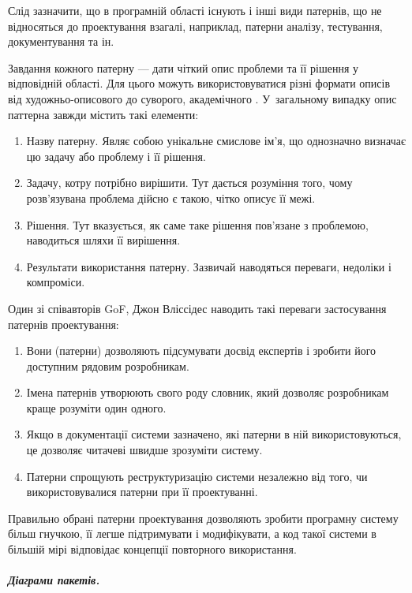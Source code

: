 \documentclass[../main.tex]{subfiles}
\begin{document}
		Слід зазначити, що в програмній області існують і інші види патернів, що не відносяться до проектування взагалі, наприклад, патерни аналізу, тестування, документування та ін.
		
		Завдання кожного патерну — дати чіткий опис проблеми та її рішення у відповідній області. Для цього можуть використовуватися різні формати описів від художньо-описового \cite{pattern_language} до суворого, академічного \cite{gof}. У~загальному випадку опис паттерна завжди містить такі елементи:
		
		\begin{enumerate}
			\item Назву патерну. Являє собою унікальне смислове ім'я, що однозначно визначає цю задачу або проблему і її рішення.
			\item Задачу, котру потрібно вирішити. Тут дається розуміння того, чому розв'язувана проблема дійсно є такою, чітко описує її межі.
			\item Рішення. Тут вказується, як саме таке рішення пов'язане з проблемою, наводиться шляхи її вирішення.
			\item Результати використання патерну. Зазвичай наводяться переваги, недоліки і компроміси.
		\end{enumerate}
		
		Один зі співавторів GoF, Джон Вліссідес \cite{patterns_application} наводить такі переваги застосування патернів проектування:
		
		\begin{enumerate}
			\item Вони (патерни) дозволяють підсумувати досвід експертів і зробити його доступним рядовим розробникам.
			\item Імена патернів утворюють свого роду словник, який дозволяє розробникам краще розуміти один одного.
			\item Якщо в документації системи зазначено, які патерни в ній використовуються, це дозволяє читачеві швидше зрозуміти систему.
			\item Патерни спрощують реструктуризацію системи незалежно від того, чи використовувалися патерни при її проектуванні.
		\end{enumerate}
		
		Правильно обрані патерни проектування дозволяють зробити програмну систему більш гнучкою, її легше підтримувати і модифікувати, а код такої системи в більшій мірі відповідає концепції повторного використання.
	
		\subparagraph{Діаграми пакетів.}
		
\end{document}
